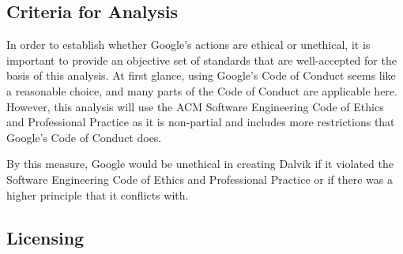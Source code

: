 \documentclass[11pt]{article}
\begin{document}
\begin{multicols}{2}
%
%
%
%

\subsection{Criteria for Analysis} %
\label{sub:analysis_criteria}

In order to establish whether Google's actions are ethical or unethical, it is
important to provide an objective set of standards that are well-accepted for
the basis of this analysis.  At first glance, using Google's Code of Conduct
\cite{google-conduct} seems like a reasonable choice, and many parts of the Code
of Conduct are applicable here.  However, this analysis will use the ACM
Software Engineering Code of Ethics and Professional Practice \cite{secode} as
it is non-partial and includes more restrictions that Google's Code of Conduct
does.

By this measure, Google would be unethical in creating Dalvik if it violated the
Software Engineering Code of Ethics and Professional Practice \cite{secode} or
if there was a higher principle that it conflicts with.


\subsection{Licensing} %
\label{sub:analysis_licensing}


\end{multicols}
\end{document}
